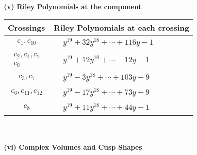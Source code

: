 \documentclass[1p]{elsarticle_modified}
\theoremstyle{definition}
\begin{document}
\flushleft \textbf{(v) Riley Polynomials at the component}\newline \\
\begin{tabular}{m{50pt}|m{274pt}}
Crossings & \hspace{64pt}Riley Polynomials at each crossing \\
\hline $$\begin{aligned}c_{1},c_{10}\end{aligned}$$&$\begin{aligned}
&y^{19}+32 y^{18}+\cdots+116 y-1
\end{aligned}$\\
\hline $$\begin{aligned}c_{2},c_{4},c_{5}\\c_{9}\end{aligned}$$&$\begin{aligned}
&y^{19}+12 y^{18}+\cdots-12 y-1
\end{aligned}$\\
\hline $$\begin{aligned}c_{3},c_{7}\end{aligned}$$&$\begin{aligned}
&y^{19}-3 y^{18}+\cdots+103 y-9
\end{aligned}$\\
\hline $$\begin{aligned}c_{6},c_{11},c_{12}\end{aligned}$$&$\begin{aligned}
&y^{19}-17 y^{18}+\cdots+73 y-9
\end{aligned}$\\
\hline $$\begin{aligned}c_{8}\end{aligned}$$&$\begin{aligned}
&y^{19}+11 y^{18}+\cdots+44 y-1
\end{aligned}$\\
\hline
\end{tabular}\\~\\
\newpage\flushleft \textbf{(vi) Complex Volumes and Cusp Shapes}
\end{document}
